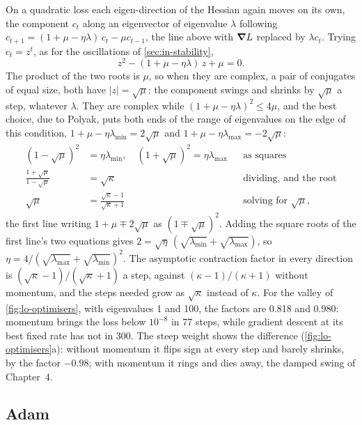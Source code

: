 On a quadratic loss each eigen-direction of the Hessian again moves on
its own, the component $c_t$ along an eigenvector of eigenvalue
$\lambda$ following $c_{t+1} = (1 + \mu - \eta\lambda)\,c_t - \mu
c_{t-1}$, the line above with $\bm{\nabla} L$ replaced by $\lambda c_t$.
Trying $c_t = z^t$, as for the oscillations of \cref{sec:in-stability},
\begin{equation*}
   z^2 - (1 + \mu - \eta\lambda)\,z + \mu = 0 .
\end{equation*}
The product of the two roots is $\mu$, so when they are complex, a pair
of conjugates of equal size, both have $\lvert z\rvert = \sqrt\mu$: the
component swings and shrinks by $\sqrt\mu$ a step, whatever $\lambda$.
They are complex while $(1 + \mu - \eta\lambda)^2 \le 4\mu$, and the
best choice, due to Polyak\cite{Polyak1964}, puts both ends of the range
of eigenvalues on the edge of this condition, $1 + \mu -
\eta\lambda_{\min} = 2\sqrt\mu$ and $1 + \mu - \eta\lambda_{\max} =
-2\sqrt\mu$:
\begin{align*}
   (1 - \sqrt\mu)^2 &= \eta\lambda_{\min} , \quad
   (1 + \sqrt\mu)^2 = \eta\lambda_{\max}
      && \text{as squares}\\
   \frac{1 + \sqrt\mu}{1 - \sqrt\mu} &= \sqrt\kappa
      && \text{dividing, and the root}\\
   \sqrt\mu &= \frac{\sqrt\kappa - 1}{\sqrt\kappa + 1}
      && \text{solving for $\sqrt\mu$,}
\end{align*}
the first line writing $1 + \mu \mp 2\sqrt\mu$ as $(1 \mp \sqrt\mu)^2$.
Adding the square roots of the first line's two equations gives $2 =
\sqrt\eta\,(\sqrt{\lambda_{\min}} + \sqrt{\lambda_{\max}})$, so $\eta =
4/(\sqrt{\lambda_{\max}} + \sqrt{\lambda_{\min}})^2$.
The asymptotic contraction factor in every direction is $(\sqrt\kappa - 1)/(\sqrt\kappa + 1)$ a step,
against $(\kappa - 1)/(\kappa + 1)$ without momentum, and the steps
needed grow as $\sqrt\kappa$ instead of $\kappa$. For the valley of
\cref{fig:lo-optimisers}, with eigenvalues 1 and 100, the factors are
0.818 and 0.980: momentum brings the loss below $10^{-8}$ in 77 steps,
while gradient descent at its best fixed rate has not in 300. The steep
weight shows the difference (\cref{fig:lo-optimisers}a): without
momentum it flips sign at every step and barely shrinks, by the factor
$-0.98$; with momentum it rings and dies away, the damped swing of
Chapter~4.

\subsection*{Adam}


